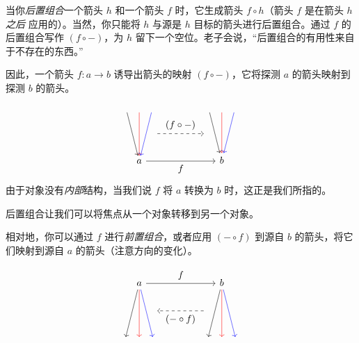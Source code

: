 \documentclass[DaoFP]{subfiles}
\begin{document}
    当你\emph{后置组合}一个箭头 $h$ 和一个箭头 $f$ 时，它生成箭头 $f \circ h$（箭头 $f$ 是在箭头 $h$ \emph{之后} 应用的）。当然，你只能将 $h$ 与源是 $h$ 目标的箭头进行后置组合。通过 $f$ 的后置组合写作 $(f \circ -)$，为 $h$ 留下一个空位。老子会说，“后置组合的有用性来自于不存在的东西。”

    因此，一个箭头 $f \colon a \to b$ 诱导出箭头的映射 $(f \circ -)$，它将探测 $a$ 的箭头映射到探测 $b$ 的箭头。

    \[
        \begin{tikzcd}
            \node (a1) at (0, 2) {};
            \node (a2) at (-0.5, 2) {};
            \node (a3) at (0.5, 2) {};
            \node (aa) at (0.5, 1) {};
            \node(a) at (0, 0) {a};
            \draw[->, red] (a1) -- (a);
            \draw[->] (a2) -- (a);
            \draw[->, blue] (a3) -- (a);
            \node (b1) at (3+0, 2) {};
            \node (b2) at (3-0.5, 2) {};
            \node (b3) at (3+0.5, 2) {};
            \node (bb) at (2.5, 1) {};
            \node(b) at (3, 0) {b};
            \draw[->, red] (b1) -- (b);
            \draw[->] (b2) -- (b);
            \draw[->, blue] (b3) -- (b);
            \draw[->] (a) -- node[below]{f} (b);
            \draw[->, dashed] (aa) -- node[above]{(f \circ -)} (bb);
        \end{tikzcd}
    \]
    由于对象没有\emph{内部}结构，当我们说 $f$ 将 $a$ 转换为 $b$ 时，这正是我们所指的。

    后置组合让我们可以将焦点从一个对象转移到另一个对象。

    相对地，你可以通过 $f$ 进行\emph{前置组合}，或者应用 $(- \circ f)$ 到源自 $b$ 的箭头，将它们映射到源自 $a$ 的箭头（注意方向的变化）。

    \[
        \begin{tikzcd}
            \node (a1) at (0, -2) {};
            \node (a2) at (-0.5, -2) {};
            \node (a3) at (0.5, -2) {};
            \node (aa) at (0.5, -1) {};
            \node(a) at (0, 0) {a};
            \draw[<-, red] (a1) -- (a);
            \draw[<-] (a2) -- (a);
            \draw[<-, blue] (a3) -- (a);
            \node (b1) at (3+0, -2) {};
            \node (b2) at (3-0.5, -2) {};
            \node (b3) at (3+0.5, -2) {};
            \node (bb) at (2.5, -1) {};
            \node(b) at (3, 0) {b};
            \draw[<-, red] (b1) -- (b);
            \draw[<-] (b2) -- (b);
            \draw[<-, blue] (b3) -- (b);
            \draw[->] (a) -- node[above]{f} (b);
            \draw[->, dashed] (bb) -- node[below]{(- \circ f)} (aa);
        \end{tikzcd}
    \]
\end{document}
